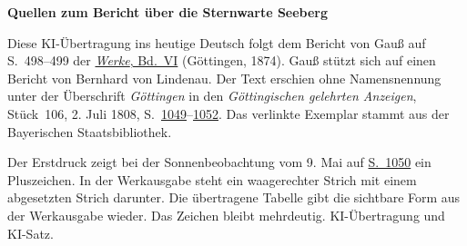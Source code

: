 \clearpage\thispagestyle{empty}
\begin{center}\textbf{Quellen zum Bericht über die Sternwarte Seeberg}\end{center}
\noindent Diese KI-Übertragung ins heutige Deutsch folgt dem Bericht von Gauß auf S.~498--499 der \href{https://gdz.sub.uni-goettingen.de/id/PPN236007467}{\textit{Werke}, Bd.~VI} (Göttingen, 1874). Gauß stützt sich auf einen Bericht von Bernhard von Lindenau. Der Text erschien ohne Namensnennung unter der Überschrift \emph{Göttingen} in den \textit{Göttingischen gelehrten Anzeigen}, Stück~106, 2. Juli 1808, S.~\href{https://api.digitale-sammlungen.de/iiif/image/v2/bsb10538674_00017/full/1800,/0/default.jpg}{1049}--\href{https://api.digitale-sammlungen.de/iiif/image/v2/bsb10538674_00020/full/1800,/0/default.jpg}{1052}. Das verlinkte Exemplar stammt aus der Bayerischen Staatsbibliothek.
\par\smallskip\noindent Der Erstdruck zeigt bei der Sonnenbeobachtung vom 9. Mai auf \href{https://api.digitale-sammlungen.de/iiif/image/v2/bsb10538674_00018/full/1800,/0/default.jpg}{S.~1050} ein Pluszeichen. In der Werkausgabe steht ein waagerechter Strich mit einem abgesetzten Strich darunter. Die übertragene Tabelle gibt die sichtbare Form aus der Werkausgabe wieder. Das Zeichen bleibt mehrdeutig. KI-Übertragung und KI-Satz.
\clearpage
